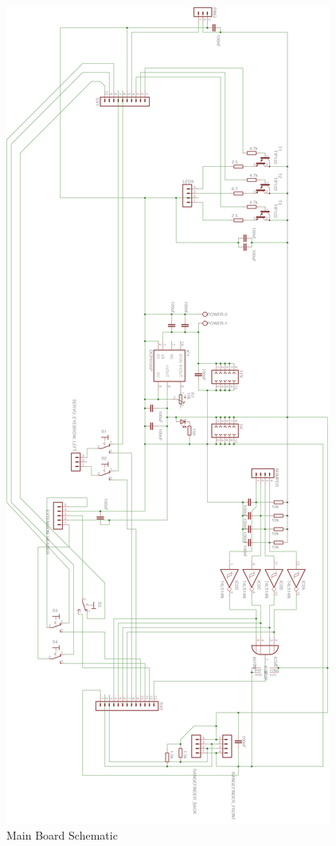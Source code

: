 \documentclass[technical_document.tex]{subfiles}
\begin{document}
 \begin{figure}[ht!]
	\centering
	\mbox{\includegraphics[scale=0.47]{Images/MainBoardSchematic.png}}
	\caption{Main Board Schematic}
	\label{fig:MBS}
\end{figure}
\end{document}

